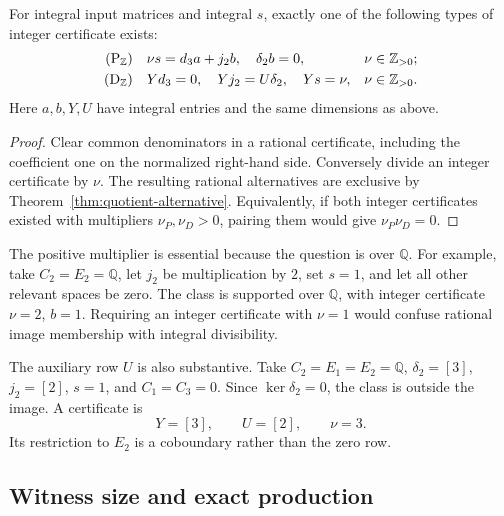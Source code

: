 \begin{corollary}
\label{cor:quotient-integer-alternative}
For integral input matrices and integral $s$, exactly one of the
following types of integer certificate exists:
\begin{align}
 \text{\rm(P$_{\mathbb Z}$)}\quad&
 \nu s=d_3a+j_2b,\quad \delta_2b=0,
 &&\nu\in\mathbb Z_{>0}; \label{eq:quotient-integer-primal}\\
 \text{\rm(D$_{\mathbb Z}$)}\quad&
 Yd_3=0,\quad Yj_2=U\delta_2,\quad Ys=\nu,
 &&\nu\in\mathbb Z_{>0}. \label{eq:quotient-integer-dual}
\end{align}
Here $a,b,Y,U$ have integral entries and the same dimensions as above.
\end{corollary}

\begin{proof}
Clear common denominators in a rational certificate, including the
coefficient one on the normalized right-hand side. Conversely divide an
integer certificate by $\nu$. The resulting rational alternatives are
exclusive by Theorem~\ref{thm:quotient-alternative}. Equivalently, if
both integer certificates existed with multipliers $\nu_P,\nu_D>0$,
pairing them would give $\nu_P\nu_D=0$.
\end{proof}

The positive multiplier is essential because the question is over
$\mathbb Q$. For example, take $C_2=E_2=\mathbb Q$, let $j_2$ be
multiplication by $2$, set $s=1$, and let all other relevant spaces be
zero. The class is supported over $\mathbb Q$, with integer certificate
$\nu=2$, $b=1$. Requiring an integer certificate with $\nu=1$ would
confuse rational image membership with integral divisibility.

The auxiliary row $U$ is also substantive. Take
$C_2=E_1=E_2=\mathbb Q$, $\delta_2=[3]$, $j_2=[2]$, $s=1$, and
$C_1=C_3=0$. Since $\ker\delta_2=0$, the class is outside the image.
A certificate is
\[
 Y=[3],\qquad U=[2],\qquad \nu=3.
\]
Its restriction to $E_2$ is a coboundary rather than the zero row.

\subsection{Witness size and exact production}

